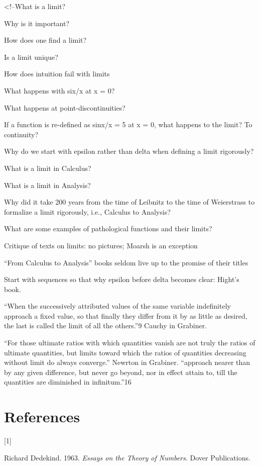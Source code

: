 \documentclass[
  a4paper,
]{article}
\newlength{\cslhangindent}
\newlength{\csllabelwidth}
\newenvironment{CSLReferences}[2] %
 {\begin{list}{}{%
  \setlength{\itemindent}{0pt}
  \setlength{\leftmargin}{0pt}
  \setlength{\parsep}{0pt}
  \ifodd #1
   \setlength{\leftmargin}{\cslhangindent}
   \setlength{\itemindent}{-1\cslhangindent}
  \fi
  \setlength{\itemsep}{#2\baselineskip}}}
 {\end{list}}
\newcommand{\CSLLeftMargin}[1]{\parbox[t]{\csllabelwidth}{\strut#1\strut}}
\newcommand{\CSLRightInline}[1]{\parbox[t]{\linewidth - \csllabelwidth}{\strut#1\strut}}
\begin{document}
\textless!--What is a limit?

Why is it important?

How does one find a limit?

Is a limit unique?

How does intuition fail with limits

What happens with six/x at x = 0?

What happens at point-discontinuities?

If a function is re-defined as sinx/x = 5 at x = 0, what happens to the
limit? To continuity?

Why do we start with epsilon rather than delta when defining a limit
rigorously?

What is a limit in Calculus?

What is a limit in Analysis?

Why did it take 200 years from the time of Leibnitz to the time of
Weierstrass to formalize a limit rigorously, i.e., Calculus to Analysis?

What are some examples of pathological functions and their limits?

Critique of texts on limits: no pictures; Moarsh is an exception

``From Calculus to Analysis'' books seldom live up to the promise of
their titles

Start with sequences so that why epsilon before delta becomes clear:
Hight's book.

``When the successively attributed values of the same variable
indefinitely approach a fixed value, so that finally they differ from it
by as little as desired, the last is called the limit of all the
others.''9 Cauchy in Grabiner.

``For those ultimate ratios with which quantities vanish are not truly
the ratios of ultimate quantities, but limits toward which the ratios of
quantities decreasing without limit do always converge.'' Newrton in
Grabiner. ``approach nearer than by any given difference, but never go
beyond, nor in effect attain to, till the quantities are diminished in
infinitum.''16

\section*{References}\label{bibliography}

\label{refs}
\begin{CSLReferences}{0}{0}
\CSLLeftMargin{{[}1{]} }%
\CSLRightInline{Richard Dedekind. 1963. \emph{{Essays on the Theory of
Numbers}}. Dover Publications.}

\end{CSLReferences}
\end{document}
